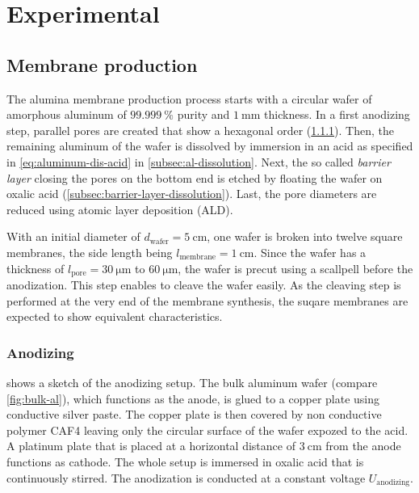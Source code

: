 \documentclass[../thesis.tex]{subfiles}
\begin{document}
  \chapter{Experimental}
  \label{ch:experimental}

    \section{Membrane production}
    \label{sec:membrane-production}

      The alumina membrane production process starts with a circular wafer of amorphous aluminum of $\SI{99,999}{\percent}$ purity and $\SI{1}{\milli\meter}$ thickness. In a first anodizing step, parallel pores are created that show a hexagonal order (\cref{subsec:anodizing}). Then, the remaining aluminum of the wafer is dissolved by immersion in an acid as specified in \cref{eq:aluminum-dis-acid} in \cref{subsec:al-dissolution}. Next, the so called \textit{barrier layer} closing the pores on the bottom end is etched by floating the wafer on oxalic acid (\cref{subsec:barrier-layer-dissolution}). Last, the pore diameters are reduced using atomic layer deposition (ALD).

      With an initial diameter of $d_\mathrm{wafer}=\SI{5}{\centi\meter}$, one wafer is broken into twelve square membranes, the side length being $l_\mathrm{membrane}=\SI{1}{\centi\meter}$. Since the wafer has a thickness of $l_\mathrm{pore}=\SI{30}{\micro\meter}$ to $\SI{60}{\micro\meter}$, the wafer is precut using a scallpell before the anodization. This step enables to cleave the wafer easily. As the cleaving step is performed at the very end of the membrane synthesis, the suqare membranes are expected to show equivalent characteristics.


      \subsection{Anodizing}
      \label{subsec:anodizing}

           shows a sketch of the anodizing setup. The bulk aluminum wafer (compare \cref{fig:bulk-al}), which functions as the anode, is glued to a copper plate using conductive silver paste. The copper plate is then covered by non conductive polymer CAF4 leaving only the circular surface of the wafer expozed to the acid. A platinum plate that is placed at a horizontal distance of $\SI{3}{\centi\meter}$ from the anode functions as cathode. The whole setup is immersed in oxalic acid that is continuously stirred. The anodization is conducted at a constant voltage $U_\mathrm{anodizing}$.
\end{document}

